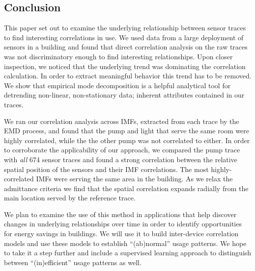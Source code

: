 



\subsection{Conclusion}





This paper set out to examine the underlying relationship between sensor traces to find interesting correlations
in use.  We used data from a large deployment of sensors in a building and found that direct correlation analysis on the raw
traces was not discriminatory enough to find interesting relationships.  Upon closer inspection, we noticed that
the underlying trend was dominating the correlation calculation.  In order to extract meaningful behavior this trend has
to be removed.  We show that empirical mode decomposition is a helpful analytical tool for detrending 
non-linear, non-stationary data; inherent attributes contained in our traces.


We ran our correlation analysis across IMFs, extracted from each trace by the EMD process, and found that the pump and light
that serve the same room were highly correlated, while the the other pump was not correlated to either.
In order to corroborate the applicability
of our approach, we compared the pump trace with \emph{all} 674 sensor traces and found a strong correlation
between the relative spatial position of the sensors and their IMF correlations.  The most highly-correlated IMFs were 
serving the same
area in the building.  As we relax the admittance criteria we find that the spatial correlation expands radially from
the main location served by the reference trace.

We plan to examine the use of this method in applications that help discover changes in underlying relationships over time
in order to identify opportunities for energy savings in buildings.  We will use it to build inter-device correlation models
and use these models to establish ``(ab)normal'' usage patterns.  We hope to take it a step further and include a
supervised learning approach to distinguish between ``(in)efficient'' usage patterns as well.






